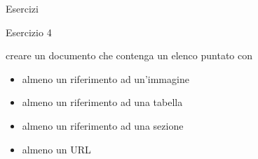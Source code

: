 \begin{frame}{Esercizi}

\begin{block}{Esercizio 4}

creare un documento che contenga un elenco puntato con
\begin{itemize}
	\item almeno un riferimento ad un'immagine
	\item almeno un riferimento ad una tabella
	\item almeno un riferimento ad una sezione
	\item almeno un URL
\end{itemize}

\end{block}

\end{frame}